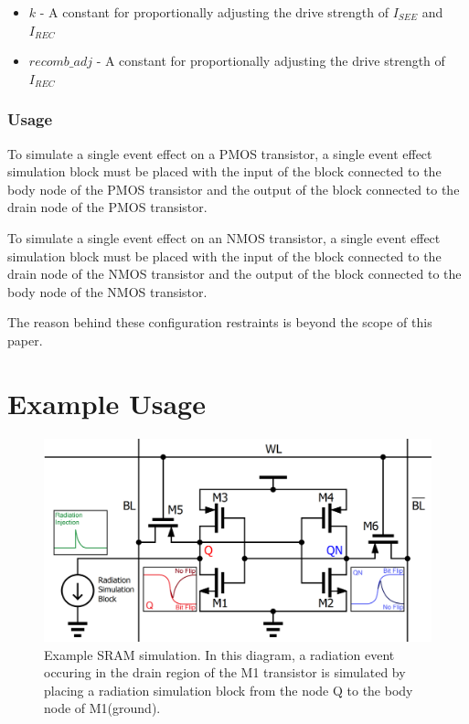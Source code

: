 \documentclass[conference]{IEEEtran}
\begin{document}
    \begin{itemize}
        \item[] \(k\) - A constant for proportionally adjusting the drive strength of \(I_{SEE}\) and \(I_{REC}\)

        \item[] \(recomb\_adj\) - A constant for proportionally adjusting the drive strength of \(I_{REC}\)

    \end{itemize}
    \vspace{1em}

    \subsubsection{Usage}
    To simulate a single event effect on a PMOS transistor, a single event effect simulation block must be placed with the input of the block connected to the body node of the PMOS transistor and the output of the block connected to the drain node of the PMOS transistor.

    To simulate a single event effect on an NMOS transistor, a single event effect simulation block must be placed with the input of the block connected to the drain node of the NMOS transistor and the output of the block connected to the body node of the NMOS transistor.
    
    The reason behind these configuration restraints is beyond the scope of this paper.

	\section{Example Usage}\label{sec:example-usage}
	\begin{figure}[htbp]
        \centering
        \includegraphics[width=0.95\linewidth]{small_sram}
        \caption{Example SRAM simulation. In this diagram, a radiation event occuring in the drain region of the M1 transistor is simulated by placing a radiation simulation block from the node Q to the body node of M1(ground).}
        \label{fig:motivating_example}
    \end{figure}    
    
\end{document}
